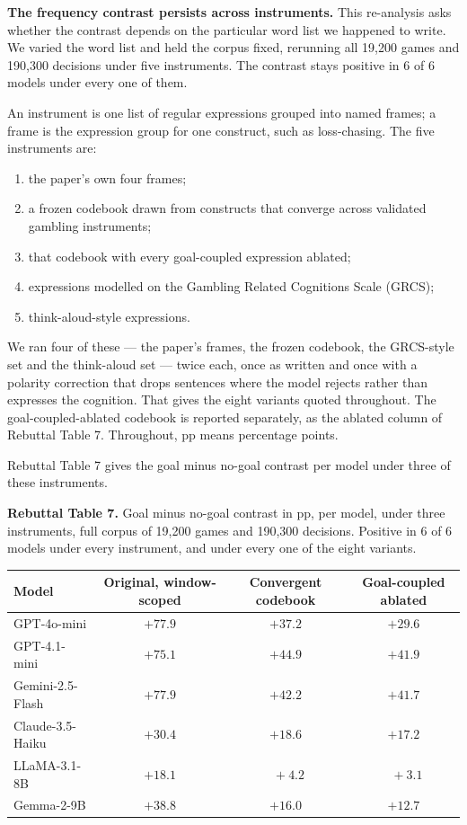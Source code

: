 \textbf{The frequency contrast persists across instruments.} This re-analysis asks whether the
contrast depends on the particular word list we happened to write. We varied the word list and held
the corpus fixed, rerunning all 19,200 games and 190,300 decisions under five instruments. The
contrast stays positive in 6 of 6 models under every one of them.

An instrument is one list of regular expressions grouped into named frames; a frame is the
expression group for one construct, such as loss-chasing. The five instruments are:

\begin{enumerate}[leftmargin=1.8em]
\item the paper's own four frames;
\item a frozen codebook drawn from constructs that converge across validated gambling instruments;
\item that codebook with every goal-coupled expression ablated;
\item expressions modelled on the Gambling Related Cognitions Scale (GRCS);
\item think-aloud-style expressions.
\end{enumerate}

\noindent
We ran four of these --- the paper's frames, the frozen codebook, the GRCS-style set and the
think-aloud set --- twice each, once as written and once with a polarity correction that drops
sentences where the model rejects rather than expresses the cognition. That gives the eight
variants quoted throughout. The goal-coupled-ablated codebook is reported separately, as the
ablated column of Rebuttal Table 7. Throughout, pp means percentage points.

Rebuttal Table 7 gives the goal minus no-goal contrast per model under three of these instruments.

\vspace{0.5em}
\noindent\textbf{Rebuttal Table 7.} Goal minus no-goal contrast in pp, per model, under three
instruments, full corpus of 19,200 games and 190,300 decisions. Positive in 6 of 6 models under
every instrument, and under every one of the eight variants.

\begin{center}
\footnotesize
\begin{tabular}{lccc}
\toprule
\textbf{Model} & \textbf{Original, window-scoped} & \textbf{Convergent codebook} & \textbf{Goal-coupled ablated} \\
\midrule
GPT-4o-mini      & $+77.9$ & $+37.2$ & $+29.6$ \\
GPT-4.1-mini     & $+75.1$ & $+44.9$ & $+41.9$ \\
Gemini-2.5-Flash & $+77.9$ & $+42.2$ & $+41.7$ \\
Claude-3.5-Haiku & $+30.4$ & $+18.6$ & $+17.2$ \\
LLaMA-3.1-8B     & $+18.1$ & $\phantom{0}+4.2$ & $\phantom{0}+3.1$ \\
Gemma-2-9B       & $+38.8$ & $+16.0$ & $+12.7$ \\
\bottomrule
\end{tabular}
\end{center}

